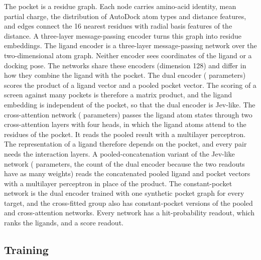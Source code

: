 The pocket is a residue graph. Each node carries amino-acid identity, mean partial charge, the distribution of AutoDock atom types and distance features, and edges connect the 16 nearest residues with radial basis features of the distance. A three-layer message-passing encoder\cite{gilmer2017} turns this graph into residue embeddings. The ligand encoder is a three-layer message-passing network over the two-dimensional atom graph. Neither encoder sees coordinates of the ligand or a docking pose. The networks share these encoders (dimension 128) and differ in how they combine the ligand with the pocket. The dual encoder (\paramsDual{} parameters) scores the product of a ligand vector and a pooled pocket vector. The scoring of a screen against many pockets is therefore a matrix product, and the ligand embedding is independent of the pocket, so that the dual encoder is Jev-like. The cross-attention network (\paramsXa{} parameters) passes the ligand atom states through two cross-attention layers with four heads, in which the ligand atoms attend to the residues of the pocket. It reads the pooled result with a multilayer perceptron. The representation of a ligand therefore depends on the pocket, and every pair needs the interaction layers. A pooled-concatenation variant of the Jev-like network (\paramsPc{} parameters, the count of the dual encoder because the two readouts have as many weights) reads the concatenated pooled ligand and pocket vectors with a multilayer perceptron in place of the product. The constant-pocket network is the dual encoder trained with one synthetic pocket graph for every target, and the cross-fitted group also has constant-pocket versions of the pooled and cross-attention networks. Every network has a hit-probability readout, which ranks the ligands, and a score readout.

\subsection{Training}

